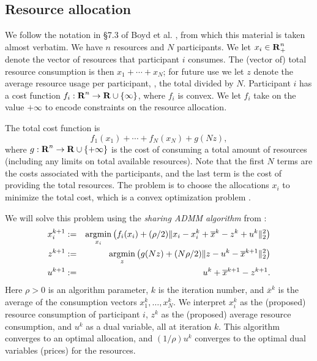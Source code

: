 

\subsection{Resource allocation}

We follow the notation in \S 7.3 of Boyd et al. \cite{ADMM},
from which this material is taken almost verbatim.
We have $n$ resources and $N$ participants.
We let $x_i \in {\mbox{\textbf{R}}}^n_+$ denote the vector of resources 
that participant $i$ consumes.  
The (vector of) total resource consumption is then $x_1 + \cdots + x_N$;
for future use we let $z$ denote the average resource
usage per participant, \ie, the total divided by $N$.
Participant $i$ has a cost function $f_i:{\mbox{\textbf{R}}}^n \to {\mbox{\textbf{R}}} \cup
\{\infty\}$, where
$f_i$ is convex.  We let $f_i$ take on the value $+\infty$ to encode
constraints on the resource allocation.

The total cost function is
\[
f_1(x_1) + \cdots + f_N (x_N) + g(Nz),
\]
where $g: {\mbox{\textbf{R}}}^n \to {\mbox{\textbf{R}}} \cup \{+\infty\}$ is the cost
of consuming a total amount of resources (including any limits on total
available resources).
Note that the first $N$ terms are the costs associated with the
participants, and the last term is the cost of providing the total
resources.
The problem is to choose the allocations $x_i$ to minimize the total cost,
which is a convex optimization problem \cite{BoVa,ADMM}.

We will solve this problem using the \emph{sharing ADMM algorithm}
from \cite{ADMM}:
\begin{eqnarray*}
x_i^{k+1} &:=&  \mathop{\mathrm{argmin}}_{x_i} \left( f_i(x_i) + (\rho/2)
\|x_i-x_i^k+\overline x^k-z^k+u^k\|^2_2\right)\\
z^{k+1} &:=&  \mathop{\mathrm{argmin}}_{z} \left( g(Nz) + (N\rho/2)
\|z - u^k - \overline x^{k+1} \|_2^2 \right)\\
u^{k+1} &:=&  u^k + \overline x^{k+1}- z^{k+1}.
\end{eqnarray*}
Here $\rho>0$ is an algorithm parameter,
$k$ is the iteration number,
and $\overline x^k$ is the average of the consumption vectors
$x^k_1, \ldots, x^k_N$.
We interpret $x_i^k$ as the (proposed) resource consumption of 
participant $i$,
$z^k$ as the (proposed) average resource consumption,
and $u^k$ as a dual variable, all at iteration $k$.
This algorithm converges to an optimal allocation,
and $(1/\rho)u^k$ converges
to the optimal dual variables (prices) for the resources.

